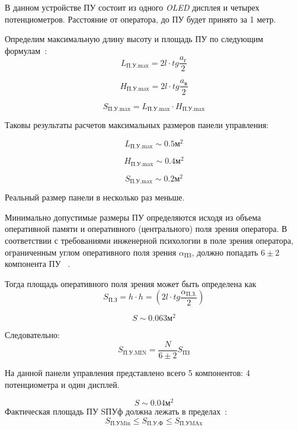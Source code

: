 В данном устройстве ПУ состоит из одного \textit{OLED} дисплея и четырех
потенциометров. Расстояние от оператора, до ПУ будет принято за 1 метр.

Определим максимальную длину высоту и площадь ПУ по следующим
формулам~\cite{Alipherenko2007}:
\begin{equation}
  L_{\text{П.У.max}} = 2l \cdot tg\frac{a_{\text{г}}}{2}
\end{equation}

\begin{equation}
  H_{\text{П.У.max}} = 2l \cdot tg\frac{a_{\text{в}}}{2}
\end{equation}

\begin{equation}
  S_{\text{П.У.max}} =   L_{\text{П.У.max}} \cdot   H_{\text{П.У.max}}
\end{equation}

Таковы результаты расчетов максимальных размеров панели управления:

$$L_{\text{П.У.max}} \sim 0.5 \text{м}^2$$

$$H_{\text{П.У.max}} \sim 0.4 \text{м}^2$$

$$S_{\text{П.У.max}} \sim 0.2 \text{м}^2$$

Реальный размер панели в несколько раз меньше.

Минимально допустимые размеры ПУ определяются исходя из объема
оперативной памяти и оперативного (центрального) поля зрения
оператора. В соответствии с требованиями инженерной психологии в поле
зрения оператора, ограниченным углом оперативного поля зрения $\alpha_{\text{ПЗ}}$,
должно попадать $6\pm 2$ компонента ПУ ~\cite{Alipherenko2007}.


Тогда площадь оперативного поля зрения может быть определена как
\begin{equation}
  S_{\text{П.З}} = h \cdot h = \left( 2l \cdot tg\frac{\alpha_{\text{П.З.}}}{2} \right)
\end{equation}

$$S \sim 0.063\text{м}^2$$

Следовательно:
\begin{equation}
  S_{\text{П.У.MIN}} = \frac{N}{6 \pm 2} S_{\text{ПЗ}}
\end{equation}

На данной панели управления представлено всего 5 компонентов:
4 потенциометра и один дисплей.

$$S \sim 0.04 \text{м}^2$$
Фактическая площадь ПУ SПУф должна лежать в пределах~\cite{Alipherenko2007}:
\begin{equation}
  S_{\text{П.УMin}} \leq S_{\text{П.У.Ф}} \leq S_{\text{П.УMAx}}
\end{equation}

